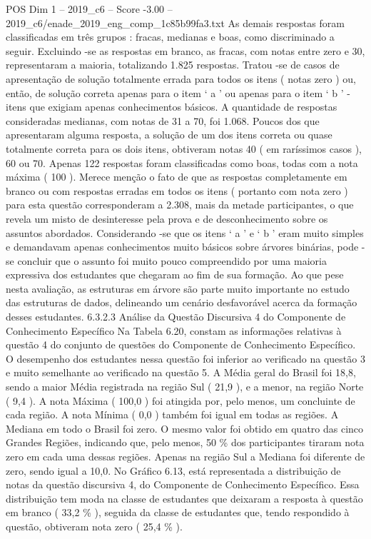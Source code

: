 \begin{textsample}{POS Dim 1 – 2019\_c6 – Score -3.00 – 2019\_c6/enade\_2019\_eng\_comp\_1c85b99fa3.txt}
As demais respostas foram classificadas em três grupos : fracas, medianas e boas, como discriminado a seguir.
Excluindo -se as respostas em branco, as fracas, com notas entre zero e 30, representaram a maioria, totalizando 1.825 respostas.
Tratou -se de casos de apresentação de solução totalmente errada para todos os itens ( notas zero ) ou, então, de solução correta apenas para o item ‘ a ’ ou apenas para o item ‘ b ’ - itens que exigiam apenas conhecimentos básicos.
A quantidade de respostas consideradas medianas, com notas de 31 a 70, foi 1.068.
Poucos dos que apresentaram alguma resposta, a solução de um dos itens correta ou quase totalmente correta para os dois itens, obtiveram notas 40 ( em raríssimos casos ), 60 ou 70.
Apenas 122 respostas foram classificadas como boas, todas com a nota máxima ( 100 ).
Merece menção o fato de que as respostas completamente em branco ou com respostas erradas em todos os itens ( portanto com nota zero ) para esta questão corresponderam a 2.308, mais da metade participantes, o que revela um misto de desinteresse pela prova e de desconhecimento sobre os assuntos abordados.
Considerando -se que os itens ‘ a ’ e ‘ b ’ eram muito simples e demandavam apenas conhecimentos muito básicos sobre árvores binárias, pode -se concluir que o assunto foi muito pouco compreendido por uma maioria expressiva dos estudantes que chegaram ao fim de sua formação.
Ao que pese nesta avaliação, as estruturas em árvore são parte muito importante no estudo das estruturas de dados, delineando um cenário desfavorável acerca da formação desses estudantes. 6.3.2.3 Análise da Questão Discursiva 4 do Componente de Conhecimento Específico Na Tabela 6.20, constam as informações relativas à questão 4 do conjunto de questões do Componente de Conhecimento Específico.
O desempenho dos estudantes nessa questão foi inferior ao verificado na questão 3 e muito semelhante ao verificado na questão 5.
A Média geral do Brasil foi 18,8, sendo a maior Média registrada na região Sul ( 21,9 ), e a menor, na região Norte ( 9,4 ).
A nota Máxima ( 100,0 ) foi atingida por, pelo menos, um concluinte de cada região.
A nota Mínima ( 0,0 ) também foi igual em todas as regiões.
A Mediana em todo o Brasil foi zero.
O mesmo valor foi obtido em quatro das cinco Grandes Regiões, indicando que, pelo menos, 50 \% dos participantes tiraram nota zero em cada uma dessas regiões.
Apenas na região Sul a Mediana foi diferente de zero, sendo igual a 10,0.
No Gráfico 6.13, está representada a distribuição de notas da questão discursiva 4, do Componente de Conhecimento Específico.
Essa distribuição tem moda na classe de estudantes que deixaram a resposta à questão em branco ( 33,2 \% ), seguida da classe de estudantes que, tendo respondido à questão, obtiveram nota zero ( 25,4 \% ).

\end{textsample}
